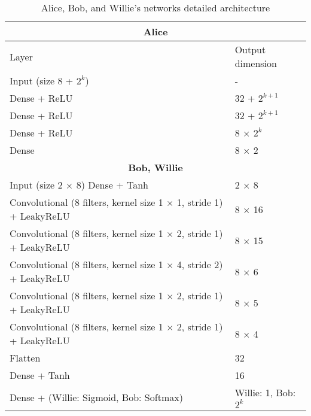 \begin{table}[tp!]
	\begin{adjustbox}{width=0.85\columnwidth,center}
		\begin{tabular}{|l|l|} 
			\hline
			\multicolumn{2}{|c|}{\textbf{Alice}} 															\\
			\hline
			Layer 																	&	Output dimension	\\
			\hline
			Input (size 8 + $2^k$)      											&	-    	 		    \\ 
			Dense + ReLU          													&	32 + $2^{k+1}$		\\
			Dense + ReLU          													&	32 + $2^{k+1}$		\\
			Dense + ReLU   															&	8 $\times$ $2^k$	\\
			Dense																	&	8 $\times$ 2	\\
			\hline   
			\hline												
			\multicolumn{2}{|c|}{\textbf{Bob, Willie}} 											\\
			\hline
			Input (size 2 $\times$ 8)
			Dense + Tanh																&	2 $\times$ 8			\\
			Convolutional (8 filters, kernel size 1 $\times$ 1, stride 1) + LeakyReLU 	&   8 $\times$ 16			\\
			Convolutional (8 filters, kernel size 1 $\times$ 2, stride 1) + LeakyReLU 	&   8 $\times$ 15			\\
			Convolutional (8 filters, kernel size 1 $\times$ 4, stride 2) + LeakyReLU 	&   8 $\times$ 6			\\
			Convolutional (8 filters, kernel size 1 $\times$ 2, stride 1) + LeakyReLU 	&   8 $\times$ 5			\\
			Convolutional (8 filters, kernel size 1 $\times$ 2, stride 1) + LeakyReLU 	&   8 $\times$ 4			\\
			Flatten															 			&   32						\\
			Dense + Tanh																&	16						\\
			Dense + (Willie: Sigmoid, Bob: Softmax)										&	Willie: 1, Bob:	$2^k$	\\
			\hline
		\end{tabular}
	\end{adjustbox}
	\caption{Alice, Bob, and Willie's networks detailed architecture}
	\label{table:covert_models_structure}
\end{table}
